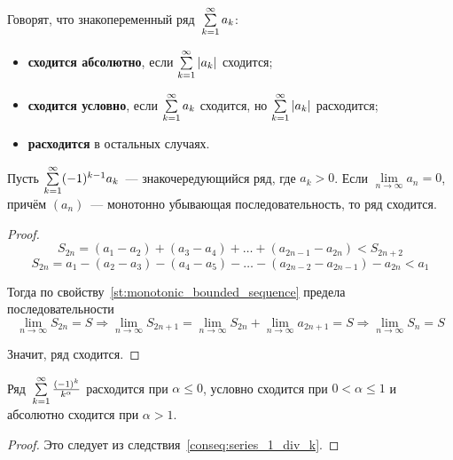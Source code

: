 Говорят, что знакопеременный ряд~$\series a_k$:
\begin{itemize}
	\item \textbf{сходится абсолютно}, если $\series |a_k|$ сходится;
	\item \textbf{сходится условно}, если $\series a_k$ сходится, но $\series |a_k|$ расходится;
	\item \textbf{расходится} в остальных случаях.
\end{itemize}

\begin{theorem}
Пусть $\series (-1)^{k-1} a_k$~--- знакочередующийся ряд, где $a_k > 0$.
Если $\lim\limits_{n \to \infty} a_n = 0$, причём $(a_n)$~--- монотонно убывающая последовательность, то ряд сходится.
\end{theorem}
\begin{proof}
\begin{equation*}
S_{2n} = (a_1 - a_2) + (a_3 - a_4) + \ldots + (a_{2n-1} - a_{2n}) < S_{2n+2}
\end{equation*}
\begin{equation*}
S_{2n} = a_1 - (a_2 - a_3) - (a_4 - a_5) - \ldots - (a_{2n-2} - a_{2n-1}) - a_{2n} < a_1
\end{equation*}

Тогда по свойству~\ref{st:monotonic_bounded_sequence} предела последовательности
\begin{equation*}
\lim_{n \to \infty} S_{2n} = S \Rightarrow
\lim_{n \to \infty} S_{2n+1} =
\lim_{n \to \infty} S_{2n} + \lim_{n \to \infty} a_{2n+1} =
S \Rightarrow
\lim_{n \to \infty} S_n = S
\end{equation*}

Значит, ряд сходится.
\end{proof}

\begin{consequent}
Ряд~$\series \frac{(-1)^k}{k^\alpha}$ расходится при $\alpha \leqslant 0$, условно сходится при $0 < \alpha \leqslant 1$ и абсолютно сходится при $\alpha > 1$.
\end{consequent}
\begin{proof}
Это следует из следствия~\ref{conseq:series_1_div_k}.
\end{proof}